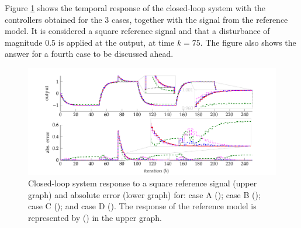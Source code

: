 \begin{exmp}
   Figure \ref{fig:exp31_time_resp} shows the temporal response of the closed-loop system with the controllers obtained for the 3 cases, together with the signal from the reference model. It is considered a square reference signal and that a disturbance of magnitude 0.5 is applied at the output, at time $k=75$. The figure also shows the answer for a fourth case to be discussed ahead.
   \begin{figure}[htpb]
          
      \footnotesize
      \centering
      \hspace*{-1cm}
      \includegraphics{Figs/ex31_resptemporal.pdf}
      \caption{Closed-loop system response to a square reference signal (upper graph) and absolute error (lower graph) for: case A (); case B (); case C (); and case D (). The response of the reference model is represented by () in the upper graph.}
      \label{fig:exp31_time_resp}
   \end{figure}


\end{exmp}

